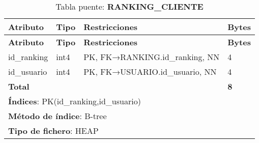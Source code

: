 \begin{longtable}{|l|l|p{5cm}|p{5cm}|}
\caption{Tabla puente: \textbf{RANKING\_CLIENTE}}\label{pf_rank_cliente}\\ \hline
\textbf{Atributo} & \textbf{Tipo} & \textbf{Restricciones} & \textbf{Bytes}\\ \hline
\endfirsthead
\hline \textbf{Atributo} & \textbf{Tipo} & \textbf{Restricciones} & \textbf{Bytes}\\ \hline
\endhead
id\_ranking & int4 & PK\*, FK→RANKING.id\_ranking, NN & 4 \\ \hline
id\_usuario & int4 & PK\*, FK→USUARIO.id\_usuario, NN & 4 \\ \hline
\textbf{Total} &    &                                 & \textbf{8}\\ \hline
\multicolumn{4}{|l|}{\textbf{Índices}: PK(id\_ranking,id\_usuario)} \\ \hline
\multicolumn{4}{|l|}{\textbf{Método de índice}: B-tree}\\ \hline
\multicolumn{4}{|l|}{\textbf{Tipo de fichero}: HEAP}\\ \hline
\end{longtable}